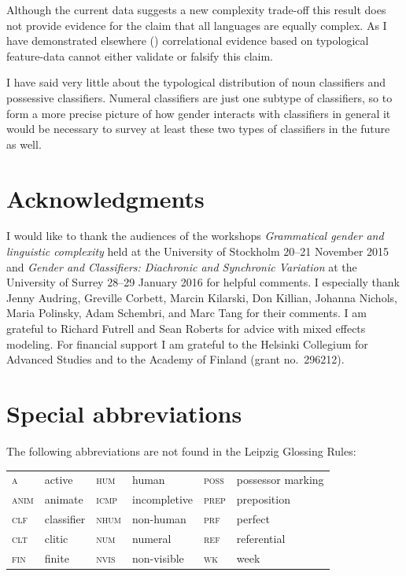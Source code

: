 \documentclass[output=collectionpaper]{langsci/langscibook}
\begin{document}
Although the current data suggests a new complexity trade-off this result does not provide evidence for the claim that all languages are equally complex. As I have demonstrated elsewhere (\citealt{Sinnemaeki2014a}) correlational evidence based on typological feature-data cannot either validate or falsify this claim.

I have said very little about the typological distribution of noun classifiers and possessive classifiers. Numeral classifiers are just one subtype of classifiers, so to form a more precise picture of how gender interacts with classifiers in general it would be necessary to survey at least these two types of classifiers in the future as well.

\section*{Acknowledgments}

I would like to thank the audiences of the workshops \textit{Grammatical gender and linguistic complexity} held at the University of Stockholm 20--21 November 2015 and \textit{Gender and Classifiers: Diachronic and Synchronic Variation} at the University of Surrey 28--29 January 2016 for helpful comments. I especially thank Jenny Audring, Greville Corbett, Marcin Kilarski, Don Killian, Johanna Nichols, Maria Polinsky, Adam Schembri, and Marc Tang for their comments. I am grateful to Richard Futrell and Sean Roberts for advice with mixed effects modeling. For financial support I am grateful to the Helsinki Collegium for Advanced Studies and to the Academy of Finland (grant no.~296212).

\section*{Special abbreviations}
\noindent The following abbreviations are not found in the Leipzig Glossing Rules:
\medskip

\begin{tabular}{@{}llllll@{}}
  \textsc{a}	&	active	&	\textsc{hum}	&	human	&	\textsc{poss}	&	possessor marking	\\
  \textsc{anim}	&	animate	&	\textsc{icmp}	&	incompletive	&	\textsc{prep}	&	preposition	\\
  \textsc{clf}	&	classifier	&	\textsc{nhum}	&	non-human	&	\textsc{prf}	&	perfect	\\
  \textsc{clt}	&	clitic	&	\textsc{num}	&	numeral	&	\textsc{ref}	&	referential	\\
  \textsc{fin}	&	finite	&	\textsc{nvis}	&	non-visible	&	\textsc{wk}	&	week	\\
\end{tabular}
\end{document}
